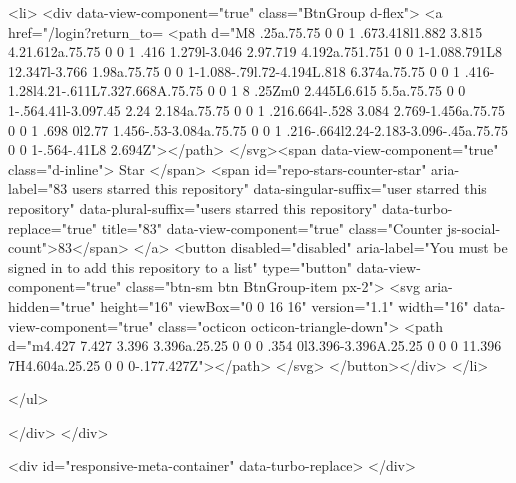   <li>
        <div data-view-component="true" class="BtnGroup d-flex">
        <a href="/login?return_to=%
    <path d="M8 .25a.75.75 0 0 1 .673.418l1.882 3.815 4.21.612a.75.75 0 0 1 .416 1.279l-3.046 2.97.719 4.192a.751.751 0 0 1-1.088.791L8 12.347l-3.766 1.98a.75.75 0 0 1-1.088-.79l.72-4.194L.818 6.374a.75.75 0 0 1 .416-1.28l4.21-.611L7.327.668A.75.75 0 0 1 8 .25Zm0 2.445L6.615 5.5a.75.75 0 0 1-.564.41l-3.097.45 2.24 2.184a.75.75 0 0 1 .216.664l-.528 3.084 2.769-1.456a.75.75 0 0 1 .698 0l2.77 1.456-.53-3.084a.75.75 0 0 1 .216-.664l2.24-2.183-3.096-.45a.75.75 0 0 1-.564-.41L8 2.694Z"></path>
</svg><span data-view-component="true" class="d-inline">
          Star
</span>          <span id="repo-stars-counter-star" aria-label="83 users starred this repository" data-singular-suffix="user starred this repository" data-plural-suffix="users starred this repository" data-turbo-replace="true" title="83" data-view-component="true" class="Counter js-social-count">83</span>
</a>        <button disabled="disabled" aria-label="You must be signed in to add this repository to a list" type="button" data-view-component="true" class="btn-sm btn BtnGroup-item px-2">    <svg aria-hidden="true" height="16" viewBox="0 0 16 16" version="1.1" width="16" data-view-component="true" class="octicon octicon-triangle-down">
    <path d="m4.427 7.427 3.396 3.396a.25.25 0 0 0 .354 0l3.396-3.396A.25.25 0 0 0 11.396 7H4.604a.25.25 0 0 0-.177.427Z"></path>
</svg>
</button></div>
  </li>


    

</ul>

        </div>
      </div>

        <div id="responsive-meta-container" data-turbo-replace>
</div>


